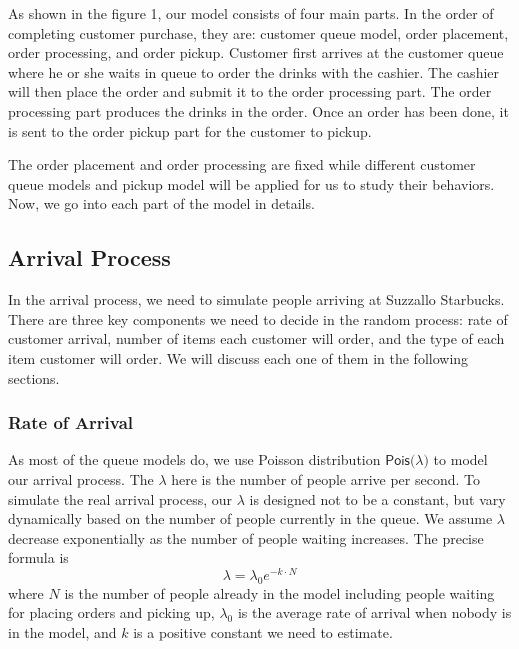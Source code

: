 \documentclass[a4paper]{article}
\newcommand{\pois}[1]{\mathsf{Pois(}{#1}\mathsf{)}}
\begin{document}
As shown in the figure 1, our model consists of four main parts. In the order of completing customer purchase, they are: customer queue model, order placement, order processing, and order pickup. Customer first arrives at the customer queue where he or she waits in queue to order the drinks with the cashier. The cashier will then place the order and submit it to the order processing part. The order processing part produces the drinks in the order. Once an order has been done, it is sent to the order pickup part for the customer to pickup.

The order placement and order processing are fixed while different customer queue models and pickup model will be applied for us to study their behaviors. Now, we go into each part of the model in details.

\subsection{Arrival Process}

In the arrival process, we need to simulate people arriving at Suzzallo Starbucks. There are three key components we need to decide in the random process: rate of customer arrival, number of items each customer will order, and the type of each item customer will order. We will discuss each one of them in the following sections. 

\subsubsection{Rate of Arrival}

As most of the queue models do, we use Poisson distribution $\pois{\lambda}$ to model our arrival process. The $\lambda$ here is the number of people arrive per second. To simulate the real arrival process, our $\lambda$ is designed not to be a constant, but vary dynamically based on the number of people currently in the queue. We assume $\lambda$ decrease exponentially as the number of people waiting increases. The precise formula is
\[\lambda=\lambda_0e^{-k\cdot N}\]
where $N$ is the number of people already in the model including people waiting for placing orders and picking up, $\lambda_0$ is the average rate of arrival when nobody is in the model, and $k$ is a positive constant we need to estimate.
\end{document}
